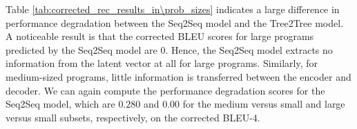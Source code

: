 \begin{table}[ht!]
\centering
\begingroup
\setlength{\tabcolsep}{3pt} %
\renewcommand{\arraystretch}{1.4} %
\endgroup
\caption{Corrected BLEU scores of reconstructed results of the best models on different input sizes. (correction scores in parenthesis)}
\label{tab:corrected_rec_results_in\prob_sizes}
\end{table}



Table \ref{tab:corrected_rec_results_in\prob_sizes} indicates a large difference in performance degradation between the Seq2Seq model and the Tree2Tree model. A noticeable result is that the corrected BLEU scores for large programs predicted by the Seq2Seq model are 0. Hence, the Seq2Seq model extracts no information from the latent vector at all for large programs. Similarly, for medium-sized programs, little information is transferred between the encoder and decoder. We can again compute the performance degradation scores for the Seq2Seq model, which are $0.280$ and $0.00$ for the medium versus small and large versus small subsets, respectively, on the corrected BLEU-4.



